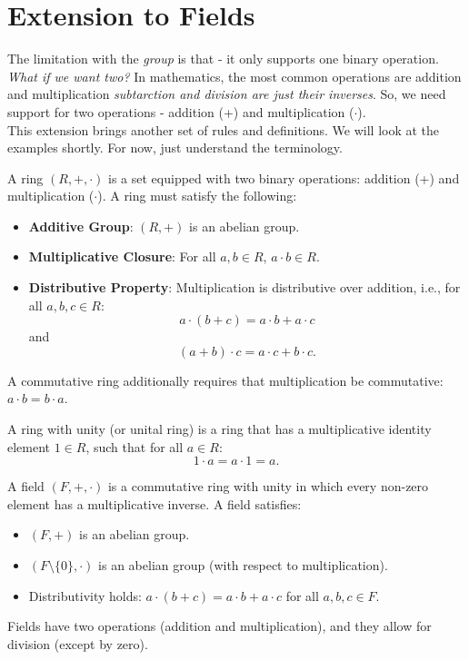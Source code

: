 \section{Extension to Fields}

The limitation with the \textit{group} is that - it only supports one binary operation. \textit{What if we want two?} In mathematics, the most common operations are addition and multiplication \textit{subtarction and division are just their inverses}. So, we need support for two operations - addition (+) and multiplication ($\cdot$). \\

This extension brings another set of rules and definitions. We will look at the examples shortly. For now, just understand the terminology. 

\begin{definition}
    A ring \( (R, +, \cdot) \) is a set equipped with two binary operations: addition (+) and multiplication ($\cdot$). A ring must satisfy the following:
    \begin{itemize}
        \item \textbf{Additive Group}: \( (R, +) \) is an abelian group.
        \item \textbf{Multiplicative Closure}: For all \( a, b \in R \), \( a \cdot b \in R \).
        \item \textbf{Distributive Property}: Multiplication is distributive over addition, i.e., for all \( a, b, c \in R \):
        \[
        a \cdot (b + c) = a \cdot b + a \cdot c
        \]
     and
        \[
        (a + b) \cdot c = a \cdot c + b \cdot c.
        \]
    \end{itemize}
    A commutative ring additionally requires that multiplication be commutative: \( a \cdot b = b \cdot a \).
\end{definition}


\begin{definition}
    A ring with unity (or unital ring) is a ring that has a multiplicative identity element \( 1 \in R \), such that for all \( a \in R \):
     \[
     1 \cdot a = a \cdot 1 = a.
     \]
\end{definition}

\begin{definition}
    A field \( (F, +, \cdot) \) is a commutative ring with unity in which every non-zero element has a multiplicative inverse. A field satisfies:
    \begin{itemize}
        \item \( (F, +) \) is an abelian group.
        \item \( (F \setminus \{0\}, \cdot) \) is an abelian group (with respect to multiplication).
        \item Distributivity holds: \( a \cdot (b + c) = a \cdot b + a \cdot c \) for all \( a, b, c \in F \).
    \end{itemize}
    Fields have two operations (addition and multiplication), and they allow for division (except by zero).
\end{definition} 

